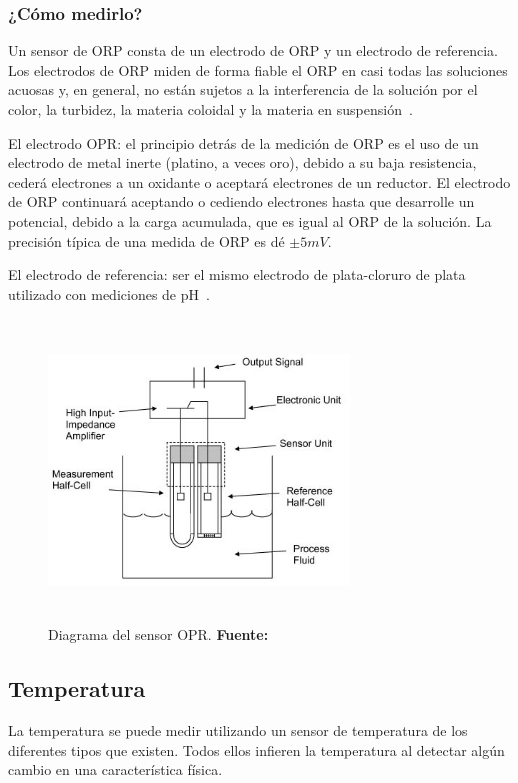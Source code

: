 \subsubsection{¿Cómo medirlo?}
Un sensor de ORP consta de un electrodo de ORP y un electrodo de referencia.
Los electrodos de ORP miden de forma fiable el ORP en casi todas las soluciones acuosas y, en general, no están sujetos a la interferencia de la solución por el color, la turbidez, la materia coloidal y la materia en suspensión~\cite{d19_committee_test_nodate}.

El electrodo OPR: el principio detr\'as de la medici\'on de ORP es el uso de un electrodo de metal inerte (platino, a veces oro), debido a su baja resistencia, ceder\'a electrones a un oxidante o aceptar\'a electrones de un reductor. 
El electrodo de ORP continuará aceptando o cediendo electrones hasta que desarrolle un potencial, debido a la carga acumulada, que es igual al ORP de la soluci\'on. 
La precisión t\'ipica de una medida de ORP es d\'e \( \pm5 mV\).

El electrodo de referencia:  ser el mismo electrodo de plata-cloruro de plata utilizado con mediciones de pH~\cite{li_chapter_2019}.

    \begin{figure}[ht]
        \centering
        \includegraphics[width=80mm, height=80mm]{Imagenes/cap2/ORP_Sensor_Image.jpg}
        \caption {Diagrama del sensor OPR. \textbf{Fuente:}
        \cite{orp_sensor_measure_nodate} }
        \label{fig:opr}
    \end{figure}


\subsection{Temperatura}
La temperatura se puede medir utilizando un sensor de temperatura de los diferentes tipos que existen. 
Todos ellos infieren la temperatura al detectar alg\'un cambio en una caracter\'istica f\'isica. 
